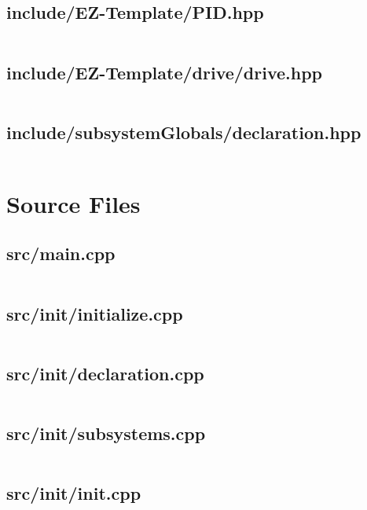 \subsection{include/EZ-Template/PID.hpp}
\inputminted[linenos,tabsize=2,breaklines, breakanywhere]{c}{PID.hpp}
\pagebreak

\subsection{include/EZ-Template/drive/drive.hpp}
\inputminted[linenos,tabsize=2,breaklines, breakanywhere]{c}{drive.hpp}
\pagebreak

\subsection{include/subsystemGlobals/declaration.hpp}
\inputminted[linenos,tabsize=2,breaklines, breakanywhere]{c}{declaration.hpp}
\pagebreak

\section{Source Files}

\subsection{src/main.cpp}
\inputminted[linenos,tabsize=2,breaklines, breakanywhere]{c}{main.cpp}
\pagebreak

\subsection{src/init/initialize.cpp}
\inputminted[linenos,tabsize=2,breaklines, breakanywhere]{c}{initialize.cpp}
\pagebreak

\subsection{src/init/declaration.cpp}
\inputminted[linenos,tabsize=2,breaklines, breakanywhere]{c}{declaration.cpp}
\pagebreak

\subsection{src/init/subsystems.cpp}
\inputminted[linenos,tabsize=2,breaklines, breakanywhere]{c}{subsystems.cpp}
\pagebreak

\subsection{src/init/init.cpp}
\inputminted[linenos,tabsize=2,breaklines, breakanywhere]{c}{init.cpp}
\pagebreak

